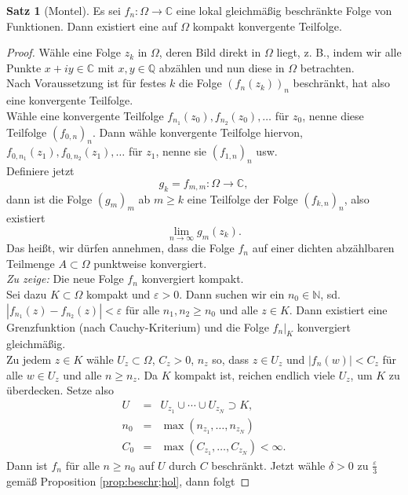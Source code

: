 \documentclass[11pt,titlepage]{article}
\theoremstyle{definition}
\newtheorem{theorem}{Satz}[section]
\theoremstyle{remark}
\begin{document}
	\begin{theorem}[Montel]
		Es sei $f_n:\Omega\to\mathbb{C}$ eine lokal gleichmäßig beschränkte Folge von Funktionen. Dann existiert 
		eine auf $\Omega$ kompakt konvergente Teilfolge.
	\end{theorem}
	
	\begin{proof}
		Wähle eine Folge $z_k$ in $\Omega$, deren Bild direkt in $\Omega$ liegt, z. B., indem wir alle Punkte 
		$x+iy\in\mathbb{C}$ mit $x,y\in\mathbb{Q}$ abzählen und nun diese in $\Omega$ betrachten. \\
		Nach Voraussetzung ist für festes $k$ die Folge $(f_n(z_k))_n$ beschränkt, hat also eine konvergente 
		Teilfolge. \\
		Wähle eine konvergente Teilfolge $f_{n_1}(z_0),f_{n_2}(z_0),\ldots$ für $z_0$, nenne diese Teilfolge 
		$(f_{0,n})_n$. Dann wähle konvergente Teilfolge hiervon, $f_{0,n_1}(z_1),f_{0,n_2}(z_1),\ldots$ für $z_1$, 
		nenne sie $(f_{1,n})_n$ usw. \\
		Definiere jetzt
		\[ g_k = f_{m,m}:\Omega\to\mathbb{C},\]
		dann ist die Folge $(g_m)_m$ ab $m\geq k$ eine Teilfolge der Folge $(f_{k,n})_n$, also existiert
		\[ \lim_{n\to\infty} g_m(z_k). \]
		Das heißt, wir dürfen annehmen, dass die Folge $f_n$ auf einer dichten abzählbaren Teilmenge 
		$A\subset\Omega$ punktweise konvergiert. \\
		\textsl{Zu zeige:} Die neue Folge $f_n$ konvergiert kompakt. \\
		Sei dazu $K\subset\Omega$ kompakt und $\varepsilon >0$. Dann suchen wir ein $n_0\in\mathbb{N}$, sd. 
		$|f_{n_1}(z)-f_{n_2}(z)|<\varepsilon$ für alle $n_1,n_2\geq n_0$ und alle $z\in K$. Dann existiert eine 
		Grenzfunktion (nach Cauchy-Kriterium) und die Folge $f_n|_K$ konvergiert gleichmäßig. \\
		Zu jedem $z\in K$ wähle $U_z\subset\Omega$, $C_z>0$, $n_z$ so, dass $z\in U_z$ und 
		$|f_n(w)|<C_z$ für alle $w\in U_z$ und alle $n\geq n_z$. Da $K$ kompakt ist, reichen endlich viele $U_z$, 
		um $K$ zu überdecken. Setze also
		\begin{eqnarray*}
			U&=&U_{z_1}\cup\cdots\cup U_{z_N} \supset K, \\
			n_0&=& \max (n_{z_1},\ldots,n_{z_N}) \\
			C_0&=&\max (C_{z_1},\ldots,C_{z_N})<\infty. 
		\end{eqnarray*}
		Dann ist $f_n$ für alle $n\geq n_0$ auf $U$ durch $C$ beschränkt. Jetzt wähle $\delta>0$ zu 
		$\frac{\varepsilon}{3}$ gemäß Proposition \ref{prop:beschr;hol}, dann folgt 

\end{proof}
\end{document}
